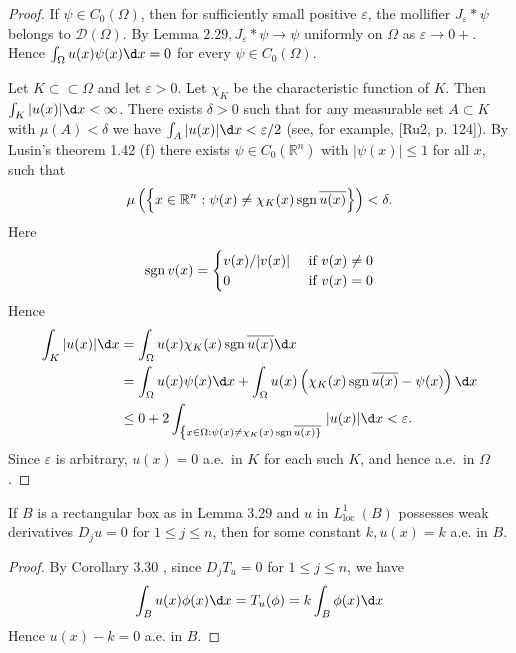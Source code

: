 \begin{proof}
  If $\psi \in C_0(\Omega)$, then for sufficiently small positive $\varepsilon$, the mollifier $J_\varepsilon * \psi$ belongs to $\mathscr{D}(\Omega)$. By Lemma $2.29, J_\varepsilon * \psi \rightarrow \psi$ uniformly on $\Omega$ as $\varepsilon \rightarrow 0+$. Hence $\int_{\Omega} u(x) \psi(x) \d x=0$ for every $\psi \in C_0(\Omega)$.
  
  Let $K \subset\subset \Omega$ and let $\varepsilon>0$. Let $\chi_K$ be the characteristic function of $K$. Then $\int_K|u(x)| \d x<\infty$. There exists $\delta>0$ such that for any measurable set $A \subset K$ with $\mu(A)<\delta$ we have $\int_A|u(x)| \d x<\varepsilon / 2$ (see, for example, [Ru2, p. 124]). By Lusin's theorem 1.42 (f) there exists $\psi \in C_0\left(\mathbb{R}^n\right)$ with $|\psi(x)| \leq 1$ for all $x$, such that
  \[
  \mu\left(\left\{x \in \mathbb{R}^n: \psi(x) \neq \chi_K(x) \operatorname{sgn} \overline{u(x)}\right\}\right)<\delta .
  \]
  Here
  \[
  \operatorname{sgn} v(x)= \begin{cases}v(x) /|v(x)| & \text { if } v(x) \neq 0 \\ 0 & \text { if } v(x)=0\end{cases}
  \]
  Hence
  \[
  \begin{aligned}
  \int_K|u(x)| \d x & =\int_{\Omega} u(x) \chi_K(x) \sgn \overline{u(x)} \d x \\
  & =\int_{\Omega} u(x) \psi(x) \d x+\int_{\Omega} u(x)\left(\chi_K(x) \sgn \overline{u(x)}-\psi(x)\right) \d x \\
  & \leq 0+2 \int_{\left\{x \in \Omega: \psi(x) \neq \chi_K(x) \sgn \overline{u(x)\}}\right.}|u(x)| \d x<\varepsilon .
  \end{aligned}
  \]
  Since $\varepsilon$ is arbitrary, $u(x)=0$ a.e.~in $K$ for each such $K$,
  and hence a.e.~in $\Omega$.
\end{proof}


\begin{corollary}
  If $B$ is a rectangular box as in Lemma 3.29 and $u$ in $L_{\text {loc }}^1(B)$ possesses weak derivatives $D_j u=0$ for $1 \leq j \leq n$, then for some constant $k, u(x)=k$ a.e. in $B$.
\end{corollary}

\begin{proof}
  By Corollary 3.30 , since $D_j T_u=0$ for $1 \leq j \leq n$, we have
  \[
  \int_B u(x) \phi(x) \d x=T_u(\phi)=k \int_B \phi(x) \d x
  \]
  Hence $u(x)-k=0$ a.e. in $B$.
\end{proof}


